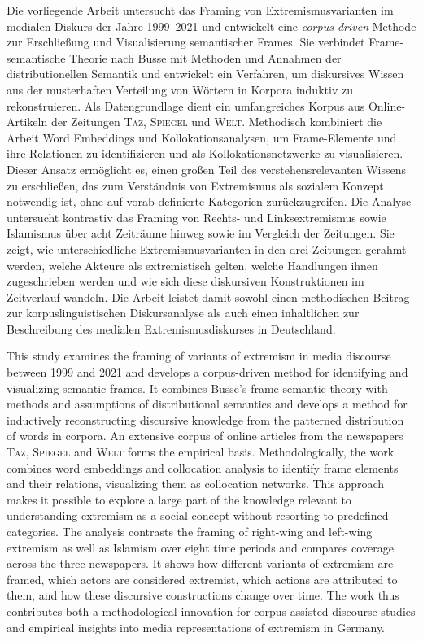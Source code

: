 Die vorliegende Arbeit untersucht das Framing von Extremismusvarianten im medialen Diskurs der Jahre 1999–2021 und entwickelt eine \emph{corpus-driven} Methode zur Erschließung und Visualisierung semantischer Frames. Sie verbindet Frame-semantische Theorie nach Busse mit Methoden und Annahmen der distributionellen Semantik und entwickelt ein Verfahren, um diskursives Wissen aus der musterhaften Verteilung von Wörtern in Korpora induktiv zu rekonstruieren.
Als Datengrundlage dient ein umfangreiches Korpus aus Online-Artikeln der Zeitungen \textsc{Taz}, \textsc{Spiegel} und \textsc{Welt}. Methodisch kombiniert die Arbeit Word Embeddings und Kollokationsanalysen, um Frame-Elemente und ihre Relationen zu identifizieren und als Kollokationsnetzwerke zu visualisieren. Dieser Ansatz ermöglicht es, einen großen Teil des verstehensrelevanten Wissens zu erschließen, das zum Verständnis von Extremismus als sozialem Konzept notwendig ist, ohne auf vorab definierte Kategorien zurückzugreifen.
Die Analyse untersucht kontrastiv das Framing von Rechts- und Linksextremismus sowie Islamismus über acht Zeiträume hinweg sowie im Vergleich der Zeitungen. Sie zeigt, wie unterschiedliche Extremismusvarianten in den drei Zeitungen gerahmt werden, welche Akteure als extremistisch gelten, welche Handlungen ihnen zugeschrieben werden und wie sich diese diskursiven Konstruktionen im Zeitverlauf wandeln. Die Arbeit leistet damit sowohl einen methodischen Beitrag zur korpuslinguistischen Diskursanalyse als auch einen inhaltlichen zur Beschreibung des medialen Extremismusdiskurses in Deutschland.


This study examines the framing of variants of extremism in media discourse between 1999 and 2021 and develops a corpus-driven method for identifying and visualizing semantic frames. It combines Busse's frame-semantic theory with methods and assumptions of distributional semantics and develops a method for inductively reconstructing discursive knowledge from the patterned distribution of words in corpora.
An extensive corpus of online articles from the newspapers \textsc{Taz}, \textsc{Spiegel} and \textsc{Welt} forms the empirical basis. Methodologically, the work combines word embeddings and collocation analysis to identify frame elements and their relations, visualizing them as collocation networks. This approach makes it possible to explore a large part of the knowledge relevant to understanding extremism as a social concept without resorting to predefined categories.
The analysis contrasts the framing of right-wing and left-wing extremism as well as Islamism over eight time periods and compares coverage across the three newspapers. It shows how different variants of extremism are framed, which actors are considered extremist, which actions are attributed to them, and how these discursive constructions change over time. The work thus contributes both a methodological innovation for corpus-assisted discourse studies and empirical insights into media representations of extremism in Germany.
